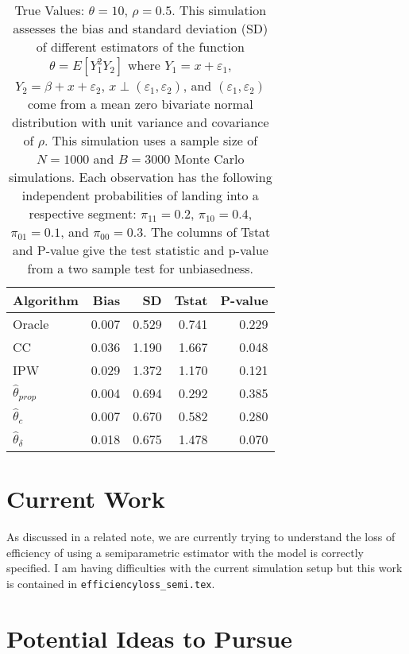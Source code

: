 \documentclass[12pt]{article}
\begin{document}
\begin{table}[ht!]
  \caption{True Values: $\theta = 10$, $\rho = 0.5$. This simulation assesses 
  the bias and standard deviation (SD) of different estimators of the function 
$\theta = E[Y_1^2 Y_2]$ where $Y_1 = x + \varepsilon_1$, $Y_2 = \beta + x + 
\varepsilon_2$, $x \perp (\varepsilon_1, \varepsilon_2)$, and 
$(\varepsilon_1, \varepsilon_2)$ come from a mean zero bivariate normal 
distribution with unit variance and covariance of $\rho$. This simulation uses 
a sample size of $N = 1000$ and $B = 3000$ Monte Carlo simulations. Each 
observation has the following independent probabilities of landing into a 
respective segment: $\pi_{11} = 0.2$, $\pi_{10} = 0.4$, $\pi_{01} = 0.1$, and
$\pi_{00} = 0.3$. The columns of Tstat and P-value give the test statistic and
p-value from a two sample test for unbiasedness.}
  \label{tab:unbalanced}
  \centering
  \begin{tabular}[t]{lrrrr}
    \toprule
    Algorithm & Bias & SD & Tstat & P-value\\
    \midrule
    Oracle & 0.007 & 0.529 & 0.741 & 0.229\\
    CC & 0.036 & 1.190 & 1.667 & 0.048\\
    IPW & 0.029 & 1.372 & 1.170 & 0.121\\
    $\hat \theta_{prop}$ & 0.004 & 0.694 & 0.292 & 0.385\\
    $\hat \theta_{c}$ & 0.007 & 0.670 & 0.582 & 0.280\\
    $\hat \theta_{\delta}$ & 0.018 & 0.675 & 1.478 & 0.070\\
    \bottomrule
  \end{tabular}
\end{table}

\section*{Current Work}

As discussed in a related note, we are currently trying to understand the 
loss of efficiency of using a semiparametric estimator with the model is 
correctly specified. I am having difficulties with the current simulation 
setup but this work is contained in \verb|efficiencyloss_semi.tex|.

\section*{Potential Ideas to Pursue}
\end{document}
